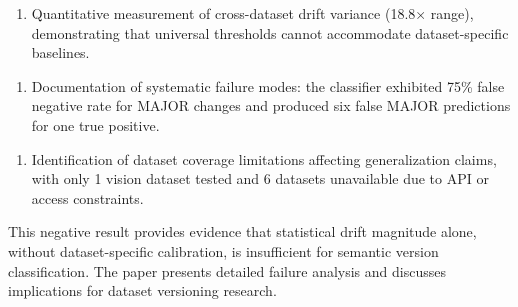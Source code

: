 \begin{enumerate}
\item Quantitative measurement of cross-dataset drift variance (18.8× range), demonstrating that universal thresholds cannot accommodate dataset-specific baselines.
\end{enumerate}

\begin{enumerate}
\item Documentation of systematic failure modes: the classifier exhibited 75\% false negative rate for MAJOR changes and produced six false MAJOR predictions for one true positive.
\end{enumerate}

\begin{enumerate}
\item Identification of dataset coverage limitations affecting generalization claims, with only 1 vision dataset tested and 6 datasets unavailable due to API or access constraints.
\end{enumerate}

This negative result provides evidence that statistical drift magnitude alone, without dataset-specific calibration, is insufficient for semantic version classification. The paper presents detailed failure analysis and discusses implications for dataset versioning research.
